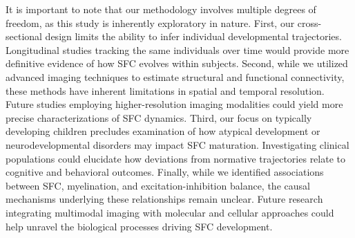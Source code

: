 It is important to note that our methodology involves multiple degrees of freedom, as this study is inherently exploratory in nature. First, our cross-sectional design limits the ability to infer individual developmental trajectories. Longitudinal studies tracking the same individuals over time would provide more definitive evidence of how SFC evolves within subjects. Second, while we utilized advanced imaging techniques to estimate structural and functional connectivity, these methods have inherent limitations in spatial and temporal resolution. Future studies employing higher-resolution imaging modalities could yield more precise characterizations of SFC dynamics. Third, our focus on typically developing children precludes examination of how atypical development or neurodevelopmental disorders may impact SFC maturation. Investigating clinical populations could elucidate how deviations from normative trajectories relate to cognitive and behavioral outcomes. Finally, while we identified associations between SFC, myelination, and excitation-inhibition balance, the causal mechanisms underlying these relationships remain unclear. Future research integrating multimodal imaging with molecular and cellular approaches could help unravel the biological processes driving SFC development.

